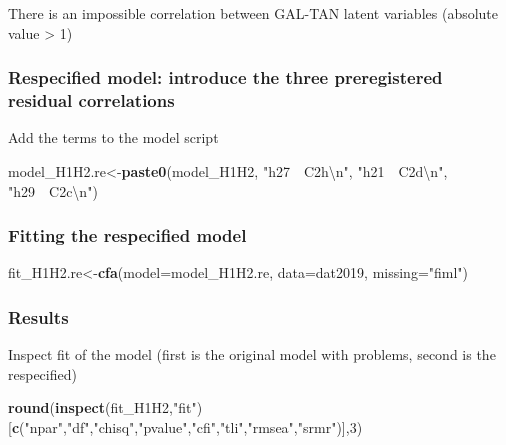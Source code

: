 \documentclass[
]{article}
\newenvironment{Shaded}{\begin{snugshade}}{\end{snugshade}}
\newcommand{\CharTok}[1]{\textcolor[rgb]{0.31,0.60,0.02}{#1}}
\newcommand{\DataTypeTok}[1]{\textcolor[rgb]{0.13,0.29,0.53}{#1}}
\newcommand{\DecValTok}[1]{\textcolor[rgb]{0.00,0.00,0.81}{#1}}
\newcommand{\KeywordTok}[1]{\textcolor[rgb]{0.13,0.29,0.53}{\textbf{#1}}}
\newcommand{\NormalTok}[1]{#1}
\newcommand{\StringTok}[1]{\textcolor[rgb]{0.31,0.60,0.02}{#1}}
\begin{document}
There is an impossible correlation between GAL-TAN latent variables
(absolute value \textgreater{} 1)

\newpage

\hypertarget{respecified-model-introduce-the-three-preregistered-residual-correlations}{%
\subsubsection{Respecified model: introduce the three preregistered
residual
correlations}\label{respecified-model-introduce-the-three-preregistered-residual-correlations}}

Add the terms to the model script

\begin{Shaded}
\begin{Highlighting}[]
\NormalTok{model_H1H2.re<-}\KeywordTok{paste0}\NormalTok{(model_H1H2,}
                      \StringTok{"h27~~C2h}\CharTok{\textbackslash{}n}\StringTok{"}\NormalTok{,}
                      \StringTok{"h21~~C2d}\CharTok{\textbackslash{}n}\StringTok{"}\NormalTok{,}
                      \StringTok{"h29~~C2c}\CharTok{\textbackslash{}n}\StringTok{"}\NormalTok{)}
\end{Highlighting}
\end{Shaded}

\hypertarget{fitting-the-respecified-model}{%
\subsubsection{Fitting the respecified
model}\label{fitting-the-respecified-model}}

\begin{Shaded}
\begin{Highlighting}[]
\NormalTok{fit_H1H2.re<-}\KeywordTok{cfa}\NormalTok{(}\DataTypeTok{model=}\NormalTok{model_H1H2.re,}
              \DataTypeTok{data=}\NormalTok{dat2019,}
              \DataTypeTok{missing=}\StringTok{"fiml"}\NormalTok{)}
\end{Highlighting}
\end{Shaded}

\hypertarget{results}{%
\subsubsection{Results}\label{results}}

Inspect fit of the model (first is the original model with problems,
second is the respecified)

\begin{Shaded}
\begin{Highlighting}[]
\KeywordTok{round}\NormalTok{(}\KeywordTok{inspect}\NormalTok{(fit_H1H2,}\StringTok{"fit"}\NormalTok{)}
\NormalTok{      [}\KeywordTok{c}\NormalTok{(}\StringTok{"npar"}\NormalTok{,}\StringTok{"df"}\NormalTok{,}\StringTok{"chisq"}\NormalTok{,}\StringTok{"pvalue"}\NormalTok{,}\StringTok{"cfi"}\NormalTok{,}\StringTok{"tli"}\NormalTok{,}\StringTok{"rmsea"}\NormalTok{,}\StringTok{"srmr"}\NormalTok{)],}\DecValTok{3}\NormalTok{)}
\end{Highlighting}
\end{Shaded}
\end{document}
